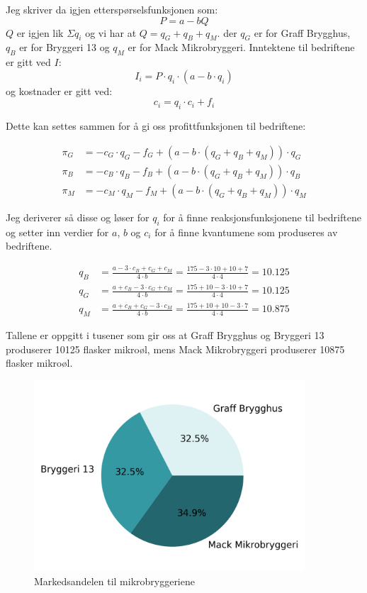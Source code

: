 \documentclass[
  12pt,
  a4paper,
  DIV=11,
  numbers=noendperiod]{scrartcl}
\begin{document}
Jeg skriver da igjen etterspørselsfunksjonen som: \[
P = a - bQ
\] \(Q\) er igjen lik \(\Sigma q_i\) og vi har at
\(Q = q_G + q_B + q_M\). der \(q_G\) er for Graff Brygghus, \(q_B\) er
for Bryggeri 13 og \(q_M\) er for Mack Mikrobryggeri. Inntektene til
bedriftene er gitt ved \(I\): \[
I_i = P \cdot q_i\cdot(a-b\cdot q_i)
\] og kostnader er gitt ved: \[
c_i = q_i \cdot c_i + f_i
\]

Dette kan settes sammen for å gi oss profittfunksjonen til bedriftene:

\begin{align*}
\pi_G &= -c_G\cdot q_G - f_G + (a-b\cdot(q_G+q_B+q_M))\cdot q_G \\
\pi_B &= -c_B\cdot q_B - f_B + (a-b\cdot(q_G+q_B+q_M))\cdot q_B \\
\pi_M &= -c_M\cdot q_M - f_M + (a-b\cdot(q_G+q_B+q_M))\cdot q_M
\end{align*}

Jeg deriverer så disse og løser for \(q_i\) for å finne
reaksjonsfunksjonene til bedriftene og setter inn verdier for \(a\),
\(b\) og \(c_i\) for å finne kvantumene som produseres av bedriftene.

\begin{align*}
q_B &= \frac{a-3\cdot c_B + c_G + c_M}{4\cdot b}= \frac{175-3\cdot 10 + 10 + 7}{4\cdot 4} = 10.125 \\
q_G &= \frac{a + c_B - 3\cdot c_G + c_M}{4\cdot b} =  \frac{175 + 10 - 3\cdot 10 + 7}{4\cdot 4} = 10.125 \\
q_M &= \frac{a + c_B + c_G -3\cdot c_M}{4\cdot b} = \frac{175 + 10 + 10 -3\cdot 7}{4\cdot 4} = 10.875
\end{align*}

Tallene er oppgitt i tusener som gir oss at Graff Brygghus og Bryggeri
13 produserer 10125 flasker mikroøl, mens Mack Mikrobryggeri produserer
10875 flasker mikroøl.

\begin{figure}[h]
\centering
\includegraphics[width=0.9\textwidth]{dokumentobjekter/figurer/markedsandel_mikrobryggerier.png}
\caption{Markedsandelen til mikrobryggeriene}
\label{fig:markedsandel}
\end{figure}
\end{document}
